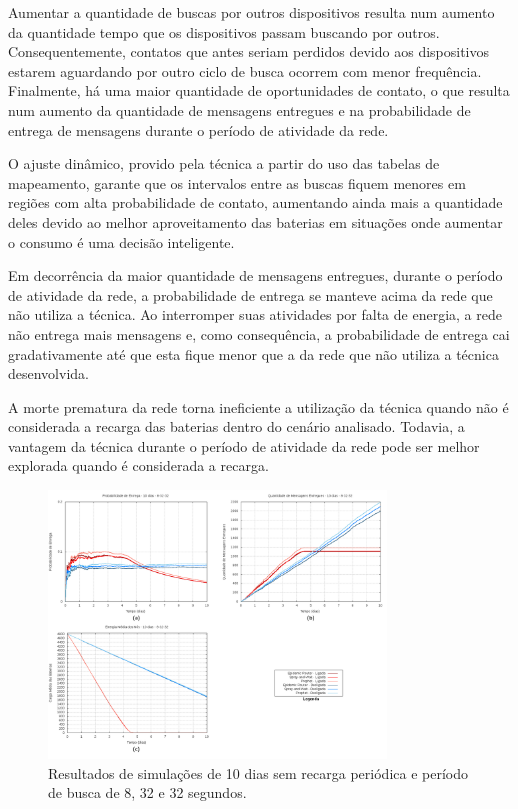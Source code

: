 Aumentar a quantidade de buscas por outros dispositivos resulta num aumento da quantidade tempo que os dispositivos passam buscando por outros. Consequentemente, contatos que antes seriam perdidos devido aos dispositivos estarem aguardando por outro ciclo de busca ocorrem com menor frequência. Finalmente, há uma maior quantidade de oportunidades de contato, o que resulta num aumento da quantidade de mensagens entregues e na probabilidade de entrega de mensagens durante o período de atividade da rede.

O ajuste dinâmico, provido pela técnica a partir do uso das tabelas de mapeamento, garante que os intervalos entre as buscas fiquem menores em regiões com alta probabilidade de contato, aumentando ainda mais a quantidade deles devido ao melhor aproveitamento das baterias em situações onde aumentar o consumo é uma decisão inteligente.

Em decorrência da maior quantidade de mensagens entregues, durante o período de atividade da rede, a probabilidade de entrega se manteve acima da rede que não utiliza a técnica. Ao interromper suas atividades por falta de energia, a rede não entrega mais mensagens e, como consequência, a probabilidade de entrega cai gradativamente até que esta fique menor que a da rede que não utiliza a técnica desenvolvida.

A morte prematura da rede torna ineficiente a utilização da técnica quando não é considerada a recarga das baterias dentro do cenário analisado. Todavia, a vantagem da técnica durante o período de atividade da rede pode ser melhor explorada quando é considerada a recarga.

\begin{figure}
\centering
\includegraphics[width=0.8\textwidth]{figuras/cap_5/graficos/8_32_32/MessageDeliveryReport_10_8-32-32_noRecharge.png}
\caption{Resultados de simulações de 10 dias sem recarga periódica e período de busca de 8, 32 e 32 segundos.}
\label{10dias_8-32-32_semRecarga}
\end{figure}

